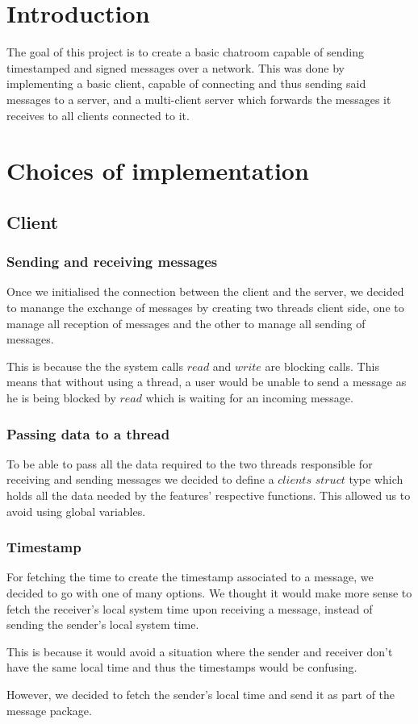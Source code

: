 \documentclass[utf8]{article}
\begin{document}
\tableofcontents
\newpage

\section{Introduction}

The goal of this project is to create a basic chatroom capable of sending timestamped and signed messages over a network. This was done by implementing a basic client, capable of connecting and thus sending said messages to a server, and  a multi-client server which forwards the messages it receives to all clients connected to it.

\section{Choices of implementation}

\subsection{Client}

\subsubsection{Sending and receiving messages}
Once we initialised the connection between the client and the server, we decided to manange the exchange of messages by creating two threads client side, one to manage all reception of messages and the other to manage all sending of messages. \par
This is because the the system calls $read$ and $write$ are blocking calls. This means that without using a thread, a user would be unable to send a message as he is being blocked by $read$ which is waiting for an incoming message.

\subsubsection{Passing data to a thread}
To be able to pass all the data required to the two threads responsible for receiving and sending messages we decided to define a $clients$ $struct$ type which holds all the data needed by the features' respective functions. This allowed us to avoid using global variables.

\subsubsection{Timestamp}
For fetching the time to create the timestamp associated to a message, we decided to go with one of many options. We thought it would make more sense to fetch the receiver's local system time upon receiving a message, instead of sending the sender's local system time. \par
This is because it would avoid a situation where the sender and receiver don't have the same local time and thus the timestamps would be confusing. \par
However, we decided to fetch the sender's local time and send it as part of the message package.
\end{document}
